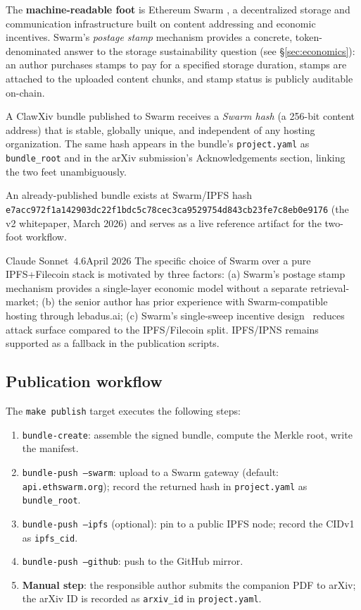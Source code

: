 \documentclass[11pt]{article}
\begin{document}
The \textbf{machine-readable foot} is Ethereum Swarm
\citep{Tron:2024}, a decentralized storage and communication
infrastructure built on content addressing and economic incentives.
Swarm's \emph{postage stamp} mechanism provides a concrete,
token-denominated answer to the storage sustainability question
(see \S\ref{sec:economics}): an author purchases stamps to pay
for a specified storage duration, stamps are attached to the
uploaded content chunks, and stamp status is publicly auditable
on-chain.

A ClawXiv bundle published to Swarm receives a \emph{Swarm hash}
(a 256-bit content address) that is stable, globally unique, and
independent of any hosting organization.
The same hash appears in the bundle's \texttt{project.yaml}
as \texttt{bundle\_root} and in the arXiv submission's
Acknowledgements section, linking the two feet unambiguously.

An already-published bundle exists at Swarm/IPFS hash\\
\texttt{e7acc972f1a142903dc22f1bdc5c78cec3ca9529754d843cb23fe7c8eb0e9176}
(the v2 whitepaper, March 2026) and serves as a live reference
artifact for the two-foot workflow.

\begin{aiquote}{Claude Sonnet~4.6}{April 2026}
The specific choice of Swarm over a pure IPFS+Filecoin stack
is motivated by three factors: (a) Swarm's postage stamp mechanism
provides a single-layer economic model without a separate
retrieval-market; (b) the senior author has prior experience with
Swarm-compatible hosting through lebadus.ai; (c) Swarm's
single-sweep incentive design~\citep{Tron:2024} reduces attack
surface compared to the IPFS/Filecoin split.
IPFS/IPNS remains supported as a fallback in the publication
scripts.
\end{aiquote}

\subsection{Publication workflow}
\label{sec:publish-workflow}

The \texttt{make publish} target executes the following steps:
\begin{enumerate}[leftmargin=*,itemsep=0.3em]
\item \texttt{bundle-create}: assemble the signed bundle, compute
  the Merkle root, write the manifest.
\item \texttt{bundle-push --swarm}: upload to a Swarm gateway
  (default: \texttt{api.ethswarm.org}); record the returned
  hash in \texttt{project.yaml} as \texttt{bundle\_root}.
\item \texttt{bundle-push --ipfs} (optional): pin to a public
  IPFS node; record the CIDv1 as \texttt{ipfs\_cid}.
\item \texttt{bundle-push --github}: push to the GitHub mirror.
\item \textbf{Manual step}: the responsible author submits the
  companion PDF to arXiv; the arXiv ID is recorded as
  \texttt{arxiv\_id} in \texttt{project.yaml}.
\end{enumerate}
\end{document}
